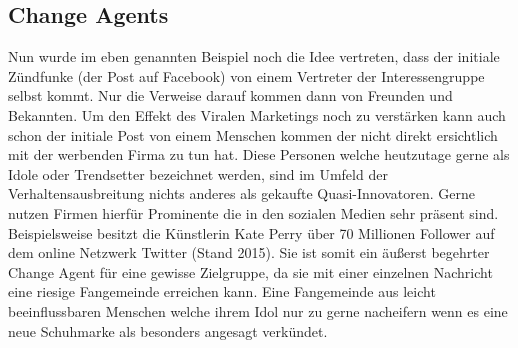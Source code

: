 \documentclass[12pt]{article}
\begin{document}
\subsection{Change Agents}
Nun wurde im eben genannten Beispiel noch die Idee vertreten, dass der initiale Zündfunke (der Post auf Facebook) von einem Vertreter der Interessengruppe selbst kommt. Nur die Verweise darauf kommen dann von Freunden und Bekannten. Um den Effekt des Viralen Marketings noch zu verstärken kann auch schon der initiale Post von einem Menschen kommen der nicht direkt ersichtlich mit der werbenden Firma zu tun hat. Diese Personen welche heutzutage gerne als Idole oder Trendsetter bezeichnet werden, sind im Umfeld der Verhaltensausbreitung nichts anderes als gekaufte Quasi-Innovatoren. Gerne nutzen Firmen hierfür Prominente die in den sozialen Medien sehr präsent sind. Beispielsweise besitzt die Künstlerin Kate Perry über 70 Millionen Follower auf dem online Netzwerk Twitter (Stand 2015). Sie ist somit ein äußerst begehrter Change Agent für eine gewisse Zielgruppe, da sie mit einer einzelnen Nachricht eine riesige Fangemeinde erreichen kann. Eine Fangemeinde aus leicht beeinflussbaren Menschen welche ihrem Idol nur zu gerne nacheifern wenn es eine neue Schuhmarke als besonders angesagt verkündet.
\end{document}
